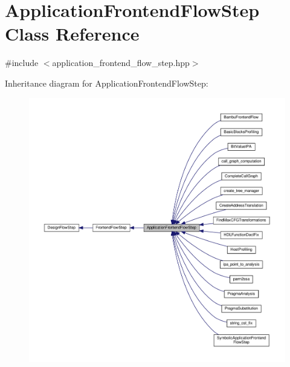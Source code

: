 \hypertarget{classApplicationFrontendFlowStep}{}\section{Application\+Frontend\+Flow\+Step Class Reference}
\label{classApplicationFrontendFlowStep}


{\ttfamily \#include $<$application\+\_\+frontend\+\_\+flow\+\_\+step.\+hpp$>$}



Inheritance diagram for Application\+Frontend\+Flow\+Step\+:
\nopagebreak
\begin{figure}[H]
\begin{center}
\leavevmode
\includegraphics[width=350pt]{dc/df3/classApplicationFrontendFlowStep__inherit__graph}
\end{center}
\end{figure}


